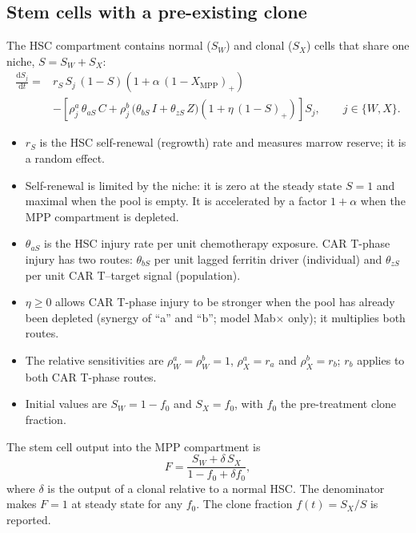 \documentclass[11pt]{article}
\newcommand{\dd}{\mathrm{d}}
\newcommand{\X}[1]{X_{\mathrm{#1}}}
\newcommand{\pos}[1]{\left(#1\right)_{+}}
\begin{document}
\subsection{Stem cells with a pre-existing clone}
The HSC compartment contains normal ($S_W$) and clonal ($S_X$) cells that share one niche, $S=S_W+S_X$:
\begin{equation}
\begin{split}
\frac{\dd S_j}{\dd t} = {}& r_S\,S_j\,(1-S)\left(1+\alpha\,\pos{1-\X{MPP}}\right)\\
 &- \left[\rho^a_j\,\theta_{aS}\,C + \rho^b_j\,\bigl(\theta_{bS}\,I+\theta_{zS}\,Z\bigr)\left(1+\eta\,\pos{1-S}\right)\right] S_j,\qquad j\in\{W,X\}.
\end{split}\label{eq:hsc}
\end{equation}
\begin{itemize}
\item $r_S$ is the HSC self-renewal (regrowth) rate and measures marrow reserve; it is a random effect.
\item Self-renewal is limited by the niche: it is zero at the steady state $S=1$ and maximal when the pool is empty. It is accelerated by a factor $1+\alpha$ when the MPP compartment is depleted.
\item $\theta_{aS}$ is the HSC injury rate per unit chemotherapy exposure. CAR T-phase injury has two routes: $\theta_{bS}$ per unit lagged ferritin driver (individual) and $\theta_{zS}$ per unit CAR T--target signal (population).
\item $\eta\geq0$ allows CAR T-phase injury to be stronger when the pool has already been depleted (synergy of ``a'' and ``b''; model Mab$\times$ only); it multiplies both routes.
\item The relative sensitivities are $\rho^a_W=\rho^b_W=1$, $\rho^a_X=r_a$ and $\rho^b_X=r_b$; $r_b$ applies to both CAR T-phase routes.
\item Initial values are $S_W=1-f_0$ and $S_X=f_0$, with $f_0$ the pre-treatment clone fraction.
\end{itemize}
The stem cell output into the MPP compartment is
\begin{equation}
F = \frac{S_W + \delta\,S_X}{1-f_0+\delta f_0}, \label{eq:F}
\end{equation}
where $\delta$ is the output of a clonal relative to a normal HSC. The denominator makes $F=1$ at steady state for any $f_0$. The clone fraction $f(t)=S_X/S$ is reported.
\end{document}
